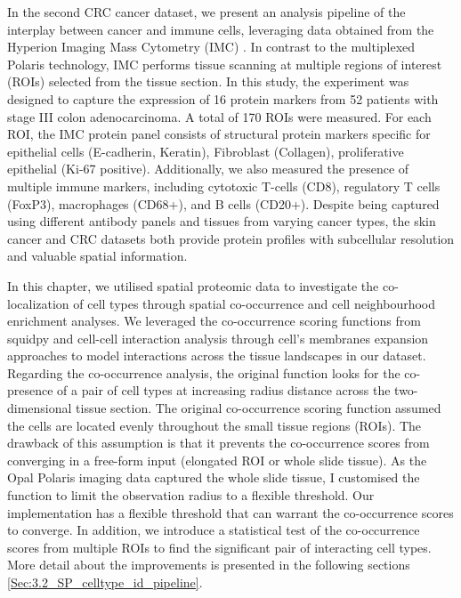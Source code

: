 In the second CRC cancer dataset, we present an analysis pipeline of the interplay between cancer and immune cells, leveraging data obtained from the Hyperion Imaging Mass Cytometry (IMC) \cite{giesen2014IMC}. In contrast to the multiplexed Polaris technology, IMC performs tissue scanning at multiple regions of interest (ROIs) selected from the tissue section. In this study, the experiment was designed to capture the expression of 16 protein markers from 52 patients with stage III colon adenocarcinoma. A total of 170 ROIs were measured. For each ROI, the IMC protein panel consists of structural protein markers specific for epithelial cells (E-cadherin, Keratin), Fibroblast (Collagen), proliferative epithelial (Ki-67 positive). Additionally, we also measured the presence of multiple immune markers, including cytotoxic T-cells (CD8), regulatory T cells (FoxP3), macrophages (CD68+), and B cells (CD20+). Despite being captured using different antibody panels and tissues from varying cancer types, the skin cancer and CRC datasets both provide protein profiles with subcellular resolution and valuable spatial information.

In this chapter, we utilised spatial proteomic data to investigate the co-localization of cell types through spatial co-occurrence and cell neighbourhood enrichment analyses. We leveraged the co-occurrence scoring functions from squidpy \cite{palla2022squidpy} and cell-cell interaction analysis through cell's membranes expansion approaches \cite{schapiro2017histocat} to model interactions across the tissue landscapes in our dataset. Regarding the co-occurrence analysis, the original function looks for the co-presence of a pair of cell types at increasing radius distance across the two-dimensional tissue section. The original co-occurrence scoring function assumed the cells are located evenly throughout the small tissue regions (\ie ROIs). The drawback of this assumption is that it prevents the co-occurrence scores from converging in a free-form input (\ie elongated ROI or whole slide tissue). As the Opal Polaris imaging data captured the whole slide tissue, I customised the function to limit the observation radius to a flexible threshold. Our implementation has a flexible threshold that can warrant the co-occurrence scores to converge. In addition, we introduce a statistical test of the co-occurrence scores from multiple ROIs to find the significant pair of interacting cell types. More detail about the improvements is presented in the following sections \ref{Sec:3.2_SP_celltype_id_pipeline}.


